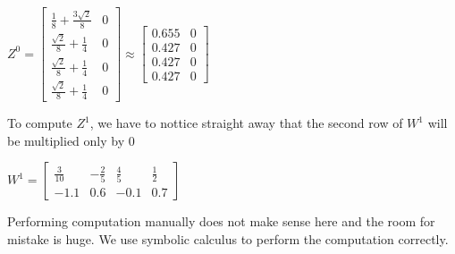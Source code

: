 \documentclass[a4paper]{article}
\begin{document}
$Z^{0} = \left[\begin{matrix}\frac{1}{8} + \frac{3 \sqrt{2}}{8} & 0\\\frac{\sqrt{2}}{8} + \frac{1}{4} & 0\\\frac{\sqrt{2}}{8} + \frac{1}{4} & 0\\\frac{\sqrt{2}}{8} + \frac{1}{4} & 0\end{matrix}\right]
\approx \begin{bmatrix}
    0.655 &  0\\
    0.427 &  0\\
    0.427 &  0\\
    0.427 &  0
  \end{bmatrix}
$


To compute $Z^{1}$, we have to nottice straight away that the second row of $W^{1}$ will be multiplied only by $0$

$W^{1} = \left[\begin{matrix}\frac{3}{10} & - \frac{2}{5} & \frac{4}{5} & \frac{1}{2}\\-1.1 & 0.6 & -0.1 & 0.7\end{matrix}\right]$

Performing computation manually does not make sense here and the room for mistake is huge.
We use symbolic calculus to perform the computation correctly.
\end{document}
